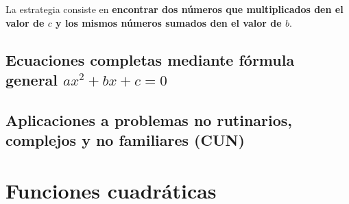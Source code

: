 \documentclass[12pt,letterpaper,article,x11names]{memoir}
\begin{document}
La estrategia consiste en \textbf{encontrar dos números que multiplicados den el valor de \(c\) y los mismos números sumados den el valor de \(b\)}.
\subsection{Ecuaciones completas mediante fórmula general \(ax^2+bx+c=0\)}
\label{sec:org6394794}

\subsection{Aplicaciones a problemas no rutinarios, complejos y no familiares (CUN)}
\label{sec:orgad6618d}

\section{Funciones cuadráticas}
\label{sec:org8f2f990}
\end{document}
